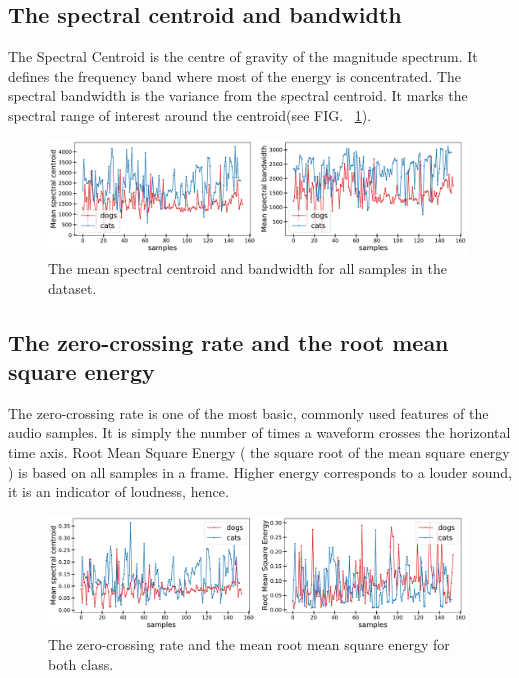 \documentclass[12pt a4paper]{article}
\numberwithin{equation}{section}
\begin{document}
\subsection{The spectral centroid and bandwidth}
The Spectral Centroid is the centre of gravity of the magnitude spectrum. It defines the frequency band where most of the energy is concentrated. The spectral bandwidth is the variance from the spectral centroid. It marks the spectral range of interest around the centroid(see FIG. ~\ref{fig7}). 

\begin{figure}[H]
\centering
\includegraphics[width=0.99\textwidth]{fig/cen_band.pdf}
\caption{The mean spectral centroid and bandwidth for all samples in the dataset.}
\label{fig7}
\end{figure}

\subsection{The zero-crossing rate and the root mean square energy}

The zero-crossing rate is one of the most basic, commonly used features of the audio samples. It is simply the number of times a waveform crosses the horizontal time axis. Root Mean Square Energy ( the square root of the mean square energy ) is based on all samples in a frame. Higher energy corresponds to a louder sound, it is an indicator of loudness, hence. 

\begin{figure}[H]
\centering
\includegraphics[width=0.99\textwidth]{fig/zer_root.pdf}
\caption{The zero-crossing rate and the mean root mean square energy for both class.}
\label{fig8}
\end{figure}
\end{document}
